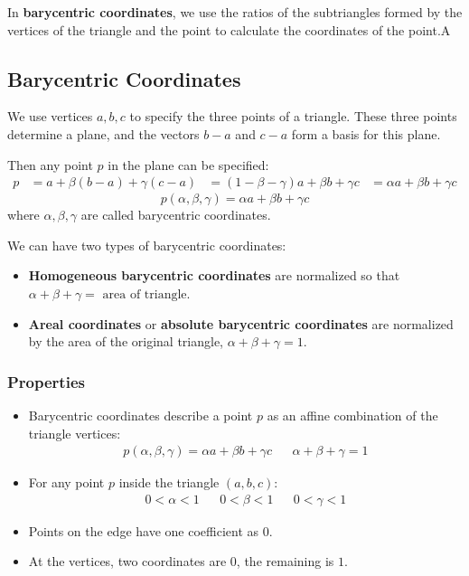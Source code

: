 \documentclass[11pt]{article}
\begin{document}
In \textbf{barycentric coordinates}, we use the ratios of the subtriangles formed by the vertices of the triangle and the point to calculate the coordinates of the point.A

\subsection{Barycentric Coordinates}
We use vertices $a, b, c$ to specify the three points of a triangle.
These three points determine a plane, and the vectors $b - a$ and $c - a$ form a basis for this plane.

Then any point $p$ in the plane can be specified:
\begin{align*}
  p &= a + \beta (b - a) + \gamma(c - a) 
  &= (1 - \beta - \gamma) a + \beta b + \gamma c
  &= \alpha a + \beta b + \gamma c
\end{align*}
\[
  p(\alpha, \beta, \gamma) = \alpha a + \beta b + \gamma c
\]
where $\alpha, \beta, \gamma$ are called barycentric coordinates.

We can have two types of barycentric coordinates:
\begin{itemize}
  \item \textbf{Homogeneous barycentric coordinates} are normalized so that $\alpha + \beta + \gamma = \text{ area of triangle}$.
  \item \textbf{Areal coordinates} or \textbf{absolute barycentric coordinates} are normalized by the area of the original triangle, $\alpha + \beta + \gamma = 1$.
\end{itemize}

\subsubsection{Properties}
\begin{itemize}
  \item Barycentric coordinates describe a point $p$ as an affine combination of the triangle vertices:
    \begin{align*}
      p(\alpha, \beta, \gamma) = \alpha a + \beta b + \gamma c & & \alpha + \beta + \gamma = 1
    \end{align*}
  \item For any point $p$ inside the triangle $(a, b, c)$:
    \begin{align*}
      0 < \alpha < 1 && 0 < \beta < 1 && 0 < \gamma < 1
    \end{align*}
  \item Points on the edge have one coefficient as $0$.
  \item At the vertices, two coordinates are $0$, the remaining is $1$.
\end{itemize}
\end{document}

